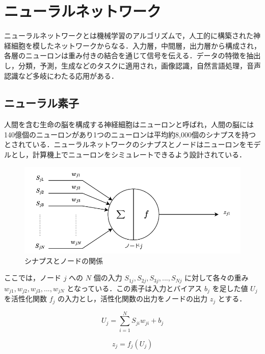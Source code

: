 \section{ニューラルネットワーク}
ニューラルネットワークとは機械学習のアルゴリズムで，人工的に構築された神経細胞を模したネットワークからなる．入力層，中間層，出力層から構成され，各層のニューロンは重み付きの結合を通じて信号を伝える\cite{深層学習}．データの特徴を抽出し，分類，予測，生成などのタスクに適用され，画像認識，自然言語処理，音声認識など多岐にわたる応用がある．

\subsection{ニューラル素子}
人間を含む生命の脳を構成する神経細胞はニューロンと呼ばれ，人間の脳には140億個のニューロンがあり1つのニューロンは平均約8,000個のシナプスを持つとされている．ニューラルネットワークのシナプスとノードはニューロンをモデルとし，計算機上でニューロンをシミュレートできるよう設計されている．\cite{深層学習}

\begin{figure}[h]
    \begin{center}
        \includegraphics[scale=0.8]{img/expnode.pdf}
        \caption{シナプスとノードの関係}
    \end{center}
\end{figure}

ここでは，ノード $ j $ への $ N $ 個の入力 $ S_{1j}, S_{2j}, S_{3j}, ..., S_{Nj} $ に対して各々の重み $ w_{j1}, w_{j2}, w_{j3}, ..., w_{jN} $ となっている．この素子は入力とバイアス $ b_{j} $ を足した値 $ U_{j} $ を活性化関数 $ f_{j} $ の入力とし，活性化関数の出力をノードの出力 $ z_{j} $ とする．

\begin{equation}
    U_{j} = \sum_{i=1}^N S_{ji}w_{ji} + b_{j}
\end{equation}

\begin{equation}
    z_{j} = f_{j}(U_{j})
\end{equation}

